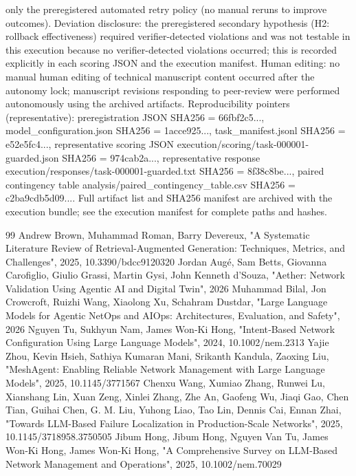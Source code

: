 \documentclass[conference]{IEEEtran}
\begin{document}
only the preregistered automated retry policy (no manual reruns to improve outcomes). Deviation disclosure: the preregistered secondary hypothesis (H2: rollback effectiveness) required verifier-detected violations and was not testable in this execution because no verifier-detected violations occurred; this is recorded explicitly in each scoring JSON and the execution manifest. Human editing: no manual human editing of technical manuscript content occurred after the autonomy lock; manuscript revisions responding to peer-review were performed autonomously using the archived artifacts. Reproducibility pointers (representative): preregistration JSON SHA256 = 66fbf2c5..., model\_configuration.json SHA256 = 1acce925..., task\_manifest.jsonl SHA256 = e52e5fc4..., representative scoring JSON execution/scoring/task-000001-guarded.json SHA256 = 974cab2a..., representative response execution/responses/task-000001-guarded.txt SHA256 = 8f38c8be..., paired contingency table analysis/paired\_contingency\_table.csv SHA256 = c2ba9cdb5d09.... Full artifact list and SHA256 manifest are archived with the execution bundle; see the execution manifest for complete paths and hashes.

\begin{thebibliography}{99}
 Andrew Brown, Muhammad Roman, Barry Devereux, "A Systematic Literature Review of Retrieval-Augmented Generation: Techniques, Metrics, and Challenges", 2025, 10.3390/bdcc9120320
 Jordan Augé, Sam Betts, Giovanna Carofiglio, Giulio Grassi, Martin Gysi, John Kenneth d'Souza, "Aether: Network Validation Using Agentic AI and Digital Twin", 2026
 Muhammad Bilal, Jon Crowcroft, Ruizhi Wang, Xiaolong Xu, Schahram Dustdar, "Large Language Models for Agentic NetOps and AIOps: Architectures, Evaluation, and Safety", 2026
 Nguyen Tu, Sukhyun Nam, James Won‐Ki Hong, "Intent‐Based Network Configuration Using Large Language Models", 2024, 10.1002/nem.2313
 Yajie Zhou, Kevin Hsieh, Sathiya Kumaran Mani, Srikanth Kandula, Zaoxing Liu, "MeshAgent: Enabling Reliable Network Management with Large Language Models", 2025, 10.1145/3771567
 Chenxu Wang, Xumiao Zhang, Runwei Lu, Xianshang Lin, Xuan Zeng, Xinlei Zhang, Zhe An, Gaofeng Wu, Jiaqi Gao, Chen Tian, Guihai Chen, G. M. Liu, Yuhong Liao, Tao Lin, Dennis Cai, Ennan Zhai, "Towards LLM-Based Failure Localization in Production-Scale Networks", 2025, 10.1145/3718958.3750505
 Jibum Hong, Jibum Hong, Nguyen Van Tu, James Won‐Ki Hong, James Won‐Ki Hong, "A Comprehensive Survey on LLM‐Based Network Management and Operations", 2025, 10.1002/nem.70029
\end{thebibliography}
\end{document}
